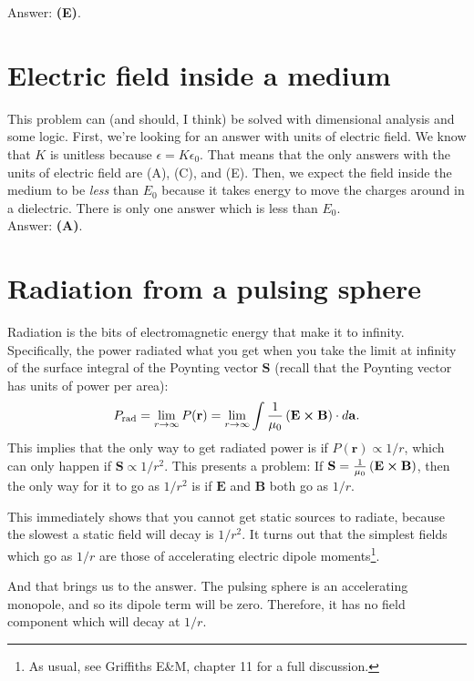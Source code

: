 \documentclass[11pt]{paper}
\newcommand{\answer}[1]{Answer: \textbf{(#1)}.}
\begin{document}
\answer{E}

\section{Electric field inside a medium}
This problem can (and should, I think) be solved with dimensional analysis and some logic.  First, we're looking for an answer with units of electric field.  We know that $K$ is unitless because $\epsilon = K\epsilon_0$.  That means that the only answers with the units of electric field are (A), (C), and (E).  Then, we expect the field inside the medium to be \emph{less} than $E_0$ because it takes energy to move the charges around in a dielectric.  There is only one answer which is less than $E_0$.\\

\answer{A}

\section{Radiation from a pulsing sphere}
Radiation is the bits of electromagnetic energy that make it to infinity.  Specifically, the power radiated what you get when you take the limit at infinity of the surface integral of the Poynting vector $\mathbf{S}$ (recall that the Poynting vector has units of power per area):
\begin{equation}
	P_\text{rad} = \lim_{r\rightarrow\infty}P(\mathbf{r}) = \lim_{r\rightarrow\infty} \int \frac{1}{\mu_0}\left(\mathbf{E}\cross\mathbf{B}\right) \cdot d\mathbf{a}.
\end{equation}
This implies that the only way to get radiated power is if $P(\mathbf{r})\propto 1/r$, which can only happen if $\mathbf{S} \propto 1/r^2$.  This presents a problem: If $\mathbf{S}=\frac{1}{\mu_0}\left(\mathbf{E}\cross\mathbf{B}\right)$, then the only way for it to go as $1/r^2$ is if $\mathbf{E}$ and $\mathbf{B}$ both go as $1/r$.

This immediately shows that you cannot get static sources to radiate, because the slowest a static field will decay is $1/r^2$.  It turns out that the simplest fields which go as $1/r$ are those of accelerating electric dipole moments\footnote{As usual, see Griffiths E\&M, chapter 11 for a full discussion.}.

And that brings us to the answer.  The pulsing sphere is an accelerating monopole, and so its dipole term will be zero.  Therefore, it has no field component which will decay at $1/r$.
\end{document}
